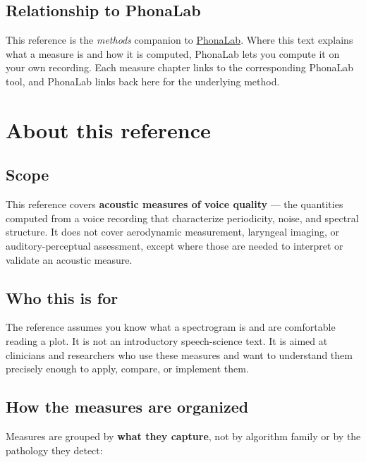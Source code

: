 \documentclass[
  english,
  letterpaper,
]{scrbook}
\begin{document}
\section*{Relationship to PhonaLab}\label{relationship-to-phonalab}


This reference is the \emph{methods} companion to
\href{https://phonalab.com}{PhonaLab}. Where this text explains what a
measure is and how it is computed, PhonaLab lets you compute it on your
own recording. Each measure chapter links to the corresponding PhonaLab
tool, and PhonaLab links back here for the underlying method.


\chapter{About this reference}\label{about-this-reference}

\section{Scope}\label{scope}

This reference covers \textbf{acoustic measures of voice quality} ---
the quantities computed from a voice recording that characterize
periodicity, noise, and spectral structure. It does not cover
aerodynamic measurement, laryngeal imaging, or auditory-perceptual
assessment, except where those are needed to interpret or validate an
acoustic measure.

\section{Who this is for}\label{who-this-is-for}

The reference assumes you know what a spectrogram is and are comfortable
reading a plot. It is not an introductory speech-science text. It is
aimed at clinicians and researchers who use these measures and want to
understand them precisely enough to apply, compare, or implement them.

\section{How the measures are
organized}\label{how-the-measures-are-organized}

Measures are grouped by \textbf{what they capture}, not by algorithm
family or by the pathology they detect:
\end{document}
